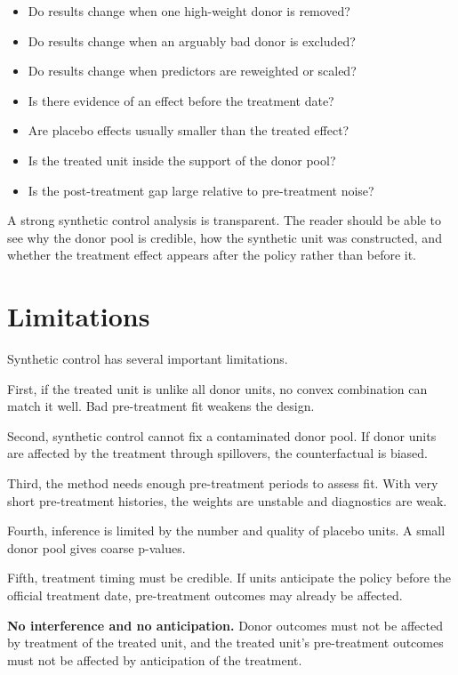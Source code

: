 \begin{itemize}
\item Do results change when one high-weight donor is removed?
\item Do results change when an arguably bad donor is excluded?
\item Do results change when predictors are reweighted or scaled?
\item Is there evidence of an effect before the treatment date?
\item Are placebo effects usually smaller than the treated effect?
\item Is the treated unit inside the support of the donor pool?
\item Is the post-treatment gap large relative to pre-treatment noise?
\end{itemize}

A strong synthetic control analysis is transparent. The reader should be able to see why the donor pool is credible, how the synthetic unit was constructed, and whether the treatment effect appears after the policy rather than before it.

\section{Limitations}

Synthetic control has several important limitations.

First, if the treated unit is unlike all donor units, no convex combination can match it well. Bad pre-treatment fit weakens the design.

Second, synthetic control cannot fix a contaminated donor pool. If donor units are affected by the treatment through spillovers, the counterfactual is biased.

Third, the method needs enough pre-treatment periods to assess fit. With very short pre-treatment histories, the weights are unstable and diagnostics are weak.

Fourth, inference is limited by the number and quality of placebo units. A small donor pool gives coarse p-values.

Fifth, treatment timing must be credible. If units anticipate the policy before the official treatment date, pre-treatment outcomes may already be affected.

\begin{assN}
\textbf{No interference and no anticipation.} Donor outcomes must not be affected by treatment of the treated unit, and the treated unit's pre-treatment outcomes must not be affected by anticipation of the treatment.
\end{assN}

